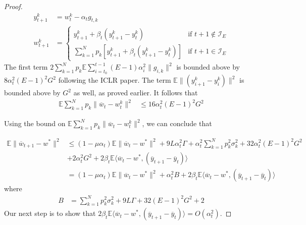 \begin{proof}
\begin{align*}
y_{t+1}^{k} & =w_{t}^{k}-\alpha_{t}g_{t,k}\\
w_{t+1}^{k} & =\begin{cases}
y_{t+1}^{k}+\beta_{t}(y_{t+1}^{k}-y_{t}^{k}) & \text{if }t+1\notin\mathcal{I}_{E}\\
\sum_{k=1}^{N}p_{k}\left[y_{t+1}^{k}+\beta_{t}(y_{t+1}^{k}-y_{t}^{k})\right] & \text{if }t+1\in\mathcal{I}_{E}
\end{cases}
\end{align*}
 The first term $2\sum_{k=1}^{N}p_{k}\mathbb{E}\sum_{i=t_{0}}^{t-1}(E-1)\alpha_{i}^{2}\|g_{i,k}\|^{2}$
is bounded above by $8\alpha_{t}^{2}(E-1)^{2}G^{2}$ following the
ICLR paper. The term $\mathbb{E}\|(y_{i+1}^{k}-y_{i}^{k})\|^{2}$
is bounded above by $G^{2}$ as well, as proved earlier. It follows
that 
\begin{align*}
\mathbb{E}\sum_{k=1}^{N}p_{k}\|\overline{w}_{t}-w_{t}^{k}\|^{2} & \leq16\alpha_{t}^{2}(E-1)^{2}G^{2}
\end{align*}

Using the bound on $\mathbb{E}\sum_{k=1}^{N}p_{k}\|\overline{w}_{t}-w_{t}^{k}\|^{2}$,
we can conclude that 

\begin{align*}
\mathbb{E}\|\overline{w}_{t+1}-w^{\ast}\|^{2} & \leq(1-\mu\alpha_{t})\mathbb{E}\|\overline{w}_{t}-w^{\ast}\|^{2}+9L\alpha_{t}^{2}\Gamma+\alpha_{t}^{2}\sum_{k=1}^{N}p_{k}^{2}\sigma_{k}^{2}+32\alpha_{t}^{2}(E-1)^{2}G^{2}\\
 & +2\alpha_{t}^{2}G^{2}+2\beta_{t}\mathbb{E}\langle\overline{w}_{t}-w^{\ast},(\overline{y}_{t+1}-\overline{y}_{t})\rangle\\
 & =(1-\mu\alpha_{t})\mathbb{E}\|\overline{w}_{t}-w^{\ast}\|^{2}+\alpha_{t}^{2}B+2\beta_{t}\mathbb{E}\langle\overline{w}_{t}-w^{\ast},(\overline{y}_{t+1}-\overline{y}_{t})\rangle
\end{align*}
 where 
\begin{align*}
B & =\sum_{k=1}^{N}p_{k}^{2}\sigma_{k}^{2}+9L\Gamma+32(E-1)^{2}G^{2}+2
\end{align*}
 Our next step is to show that $2\beta_{t}\mathbb{E}\langle\overline{w}_{t}-w^{\ast},(\overline{y}_{t+1}-\overline{y}_{t})\rangle=O(\alpha_{t}^{2})$. 


\end{proof}
